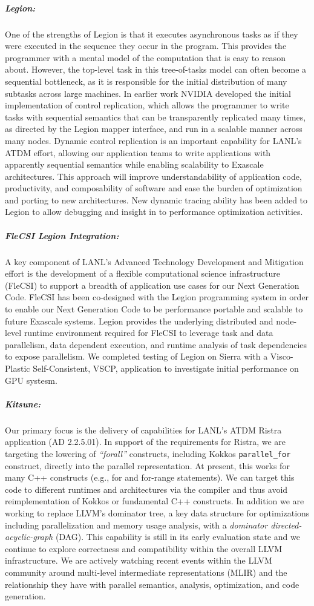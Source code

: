 \subparagraph{Legion:} 
One of the strengths of Legion is that it executes asynchronous tasks as if they were executed in the sequence they occur in the program. This provides the programmer with a mental model of the computation that is easy to reason about. However, the top-level task in this tree-of-tasks model can often become a sequential bottleneck, as it is responsible for the initial distribution of many subtasks across large machines. In earlier work NVIDIA developed the initial implementation of control replication, which allows the programmer to write tasks with sequential semantics that can be  transparently replicated many times, as directed by the Legion mapper interface, and run in a scalable manner across many nodes.
Dynamic control replication is an important capability for LANL's ATDM effort, allowing our application teams to write applications with apparently sequential semantics while enabling scalability to Exascale architectures. This approach will improve understandability of application code, productivity, and composability of software and ease the burden of optimization and porting to new architectures. 
New dynamic tracing ability has been added to Legion to allow debugging and insight in to performance optimization activities.

\subparagraph{FleCSI Legion Integration:} 
A key component of LANL's Advanced Technology  Development and Mitigation effort is the development of a flexible computational science infrastructure (FleCSI) to support a breadth of application use cases for our Next Generation Code. FleCSI has been co-designed with the Legion programming system in order to enable our Next Generation Code to be performance portable and scalable to future Exascale systems. Legion provides the underlying distributed and node-level runtime environment required for FleCSI to leverage task and data parallelism, data dependent execution, and runtime analysis of task dependencies to expose parallelism. We completed testing of Legion on Sierra with a Visco-Plastic Self-Consistent, VSCP, application to investigate initial performance on GPU systesm.

\subparagraph{Kitsune:}
Our primary focus is the delivery of capabilities for LANL's ATDM
Ristra application (AD 2.2.5.01).  In support of the requirements for
Ristra, we are targeting the lowering of \textit{``forall''} constructs,
including Kokkos \texttt{parallel\_for} construct, directly into the
parallel representation.  At present, this works for many C++ constructs
(e.g., for and for-range statements).  We can target this code to different
runtimes and architectures via the compiler and thus avoid reimplementation
of Kokkos or fundamental C++ constructs. In addition we are working to replace
LLVM's dominator tree, a key data structure for optimizations including
parallelization and memory usage analysis, with a \emph{dominator directed-acyclic-graph}
(DAG).  This capability is still in its early evaluation state and we continue to
explore correctness and compatibility within the overall LLVM infrastructure. We are
actively watching recent events within the LLVM community around
multi-level intermediate representations (MLIR) and the relationship
they have with parallel semantics, analysis, optimization, and code
generation.

